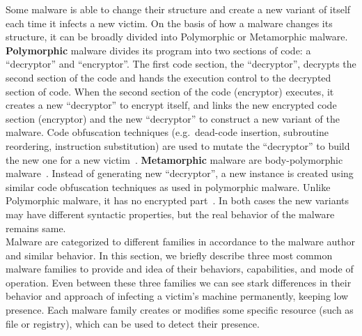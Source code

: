 Some malware is able to change their structure and create a new variant of itself each time it infects a new victim.
On the basis of how a malware changes its structure, it can be broadly divided into Polymorphic or Metamorphic malware.
\textbf{Polymorphic} malware divides its program into two sections of code: a ``decryptor'' and ``encryptor''.
The first code section, the ``decryptor'', decrypts the second section of the code and hands the execution control to the decrypted section of code.
When the second section of the code (encryptor) executes, it creates a new ``decryptor'' to encrypt itself, and links the new encrypted code section (encryptor) and the new ``decryptor'' to construct a new variant of the malware.
Code obfuscation techniques (e.g.\ dead-code insertion, subroutine reordering, instruction substitution) are used to mutate the ``decryptor'' to build the new one for a new victim~\cite[]{rad2011evolution}.
\textbf{Metamorphic} malware are body-polymorphic malware~\cite[]{szor2001hunting}.
Instead of generating new ``decryptor'', a new instance is created using similar code obfuscation techniques as used in polymorphic malware.
Unlike Polymorphic malware, it has no encrypted part~\cite[]{rad2012camouflage}.
In both cases the new variants may have different syntactic properties, but the real behavior of the malware remains same.\\

Malware are categorized to different families in accordance to the malware author and similar behavior.
In this section, we briefly describe three most common malware families to provide and idea of their behaviors, capabilities, and mode of operation.
Even between these three families we can see stark differences in their behavior and approach of infecting a victim's machine permanently, keeping low presence.
Each malware family creates or modifies some specific resource (such as file or registry), which can be used to detect their presence.
